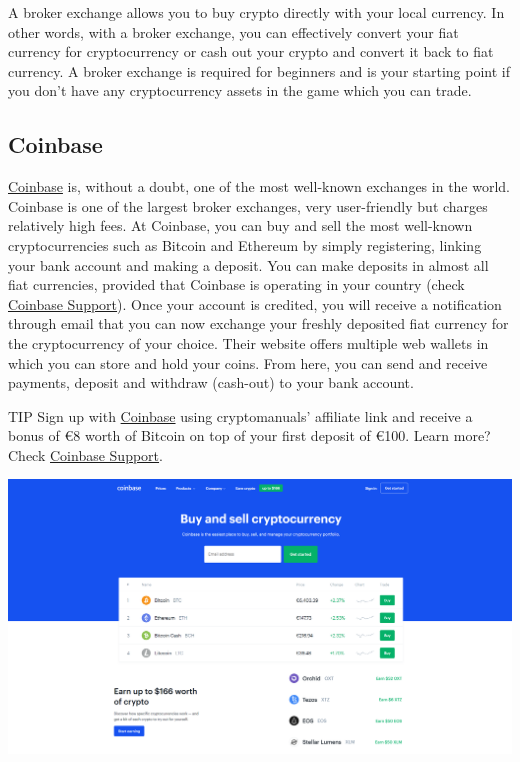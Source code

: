 A broker exchange allows you to buy crypto directly with your local currency. In other words, with a broker exchange, you can effectively convert your fiat currency for cryptocurrency or cash out your crypto and convert it back to fiat currency. A broker exchange is required for beginners and is your starting point if you don't have any cryptocurrency assets in the game which you can trade. 


\subsection*{Coinbase}
\href{https://www.coinbase.com/join/51954a2b26a1bcc484000015}{Coinbase} is, without a doubt, one of the most well-known exchanges in the world. Coinbase is one of the largest broker exchanges, very user-friendly but charges relatively high fees. At Coinbase, you can buy and sell the most well-known cryptocurrencies such as Bitcoin and Ethereum by simply registering, linking your bank account and making a deposit. You can make deposits in almost all fiat currencies, provided that Coinbase is operating in your country (check \href{https://support.coinbase.com/}{Coinbase Support}). Once your account is credited, you will receive a notification through email that you can now exchange your freshly deposited fiat currency for the cryptocurrency of your choice. Their website offers multiple web wallets in which you can store and hold your coins. From here, you can send and receive payments, deposit and withdraw (cash-out) to your bank account. 

    \bigskip
    \begin{topbox}{TIP}
    Sign up with \href{https://www.coinbase.com/join/51954a2b26a1bcc484000015}{Coinbase} using {\selectfont cryptomanuals'} affiliate link and receive a bonus of \euro 8 worth of Bitcoin on top of your first deposit of \euro 100.
    \tcblower
    Learn more? Check \href{https://support.coinbase.com/}{Coinbase Support}.
    \end{topbox}
    
    \begin{borderbox}
        \includegraphics[width=\textwidth]{img/ch-exchanges/coinbase.png}
    \end{borderbox}

